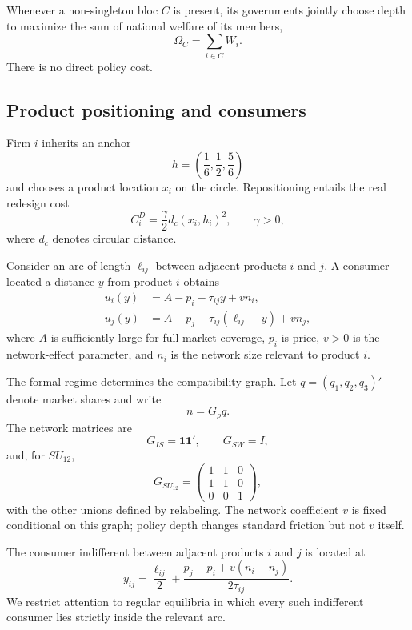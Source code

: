 Whenever a non-singleton bloc $C$ is present, its governments jointly choose depth to maximize the sum of national welfare of its members,
\begin{equation}\label{eq:bloc-objective}
\Omega_C=\sum_{i\in C}W_i.
\end{equation}
There is no direct policy cost.

\subsection{Product positioning and consumers}

Firm $i$ inherits an anchor
\[
h=\left(\frac16,\frac12,\frac56\right)
\]
and chooses a product location $x_i$ on the circle. Repositioning entails the real redesign cost
\begin{equation}\label{eq:reposition-cost}
C_i^D=\frac{\gamma}{2}d_c(x_i,h_i)^2,
\qquad \gamma>0,
\end{equation}
where $d_c$ denotes circular distance.

Consider an arc of length $\ell_{ij}$ between adjacent products $i$ and $j$. A consumer located a distance $y$ from product $i$ obtains
\begin{align}
 u_i(y)&=A-p_i-\tau_{ij}y+vn_i,\\
 u_j(y)&=A-p_j-\tau_{ij}(\ell_{ij}-y)+vn_j,
\end{align}
where $A$ is sufficiently large for full market coverage, $p_i$ is price, $v>0$ is the network-effect parameter, and $n_i$ is the network size relevant to product $i$.

The formal regime determines the compatibility graph. Let $q=(q_1,q_2,q_3)'$ denote market shares and write
\[
n=G_\rho q.
\]
The network matrices are
\[
G_{IS}=\mathbf 1\mathbf 1',\qquad
G_{SW}=I,
\]
and, for $SU_{12}$,
\[
G_{SU_{12}}=
\begin{pmatrix}
1&1&0\\
1&1&0\\
0&0&1
\end{pmatrix},
\]
with the other unions defined by relabeling. The network coefficient $v$ is fixed conditional on this graph; policy depth changes standard friction but not $v$ itself.

The consumer indifferent between adjacent products $i$ and $j$ is located at
\begin{equation}\label{eq:indifferent}
y_{ij}=\frac{\ell_{ij}}{2}
+\frac{p_j-p_i+v(n_i-n_j)}{2\tau_{ij}}.
\end{equation}
We restrict attention to regular equilibria in which every such indifferent consumer lies strictly inside the relevant arc.

